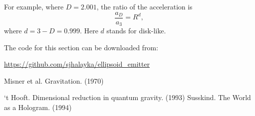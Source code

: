 \documentclass[12pt]{article}
\begin{document}
For example, where $D = 2.001$, the ratio of the acceleration is
\begin{equation}
\frac{a_{D}}{a_{3}} = R^{d}, 
\end{equation}
where $d = 3 - D = 0.999$.
Here $d$ stands for disk-like.

The code for this section can be downloaded from:

\url{https://github.com/sjhalayka/ellipsoid_emitter}












\begin{thebibliography}{9}

 Misner et al. Gravitation. (1970)

 `t Hooft. Dimensional reduction in quantum gravity. (1993)
 Susskind. The World as a Hologram. (1994)








\end{thebibliography}
\end{document}
